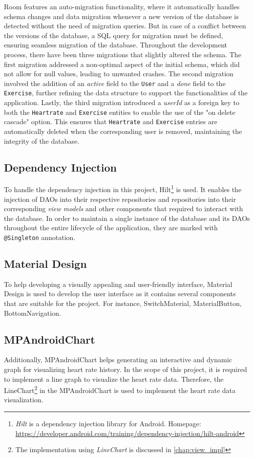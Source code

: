 Room features an auto-migration functionality, where it automatically handles schema changes and data migration whenever a new version of the database is detected without the need of migration queries.
But in case of a conflict between the versions of the database, a SQL query for migration must be defined, ensuring seamless migration of the database.
Throughout the development process, there have been three migrations that slightly altered the schema. The first migration addressed a non-optimal aspect of the initial schema, which did not allow for null values, leading to unwanted crashes. 
The second migration involved the addition of an \emph{active} field to the \texttt{User} and a \emph{done} field to the \texttt{Exercise}, further refining the data structure to support the functionalities of the application.
Lastly, the third migration introduced a \emph{userId} as a foreign key to both the \texttt{Heartrate} and \texttt{Exercise} entities to enable the use of the "on delete cascade" option. 
This ensures that \texttt{Heartrate} and \texttt{Exercise} entries are automatically deleted when the corresponding user is removed, maintaining the integrity of the database.


\subsection{Dependency Injection}
To handle the dependency injection in this project, Hilt\footnote{\emph{Hilt} is a dependency injection library for Android. Homepage: \url{https://developer.android.com/training/dependency-injection/hilt-android}} is used. 
It enables the injection of DAOs into their respective repositories and repositories into their corresponding \emph{view models} and other components that required to interact with the database. 
In order to maintain a single instance of the database and its DAOs throughout the entire lifecycle of the application, they are marked with \texttt{@Singleton} annotation. 

\subsection{Material Design}
To help developing a visually appealing and user-friendly interface, Material Design is used to develop the user interface as it contains several components that are suitable for the project. 
For instance, SwitchMaterial, MaterialButton, BottomNavigation.

\subsection{MPAndroidChart}
Additionally, MPAndroidChart helps generating an interactive and dynamic graph for visualizing heart rate history.
In the scope of this project, it is required to implement a line graph to visualize the heart rate data. 
Therefore, the LineChart\footnote{The implementation using \emph{LineChart} is discussed in \autoref{chap:view_impl}} in the MPAndroidChart is used to implement the heart rate data visualization.

